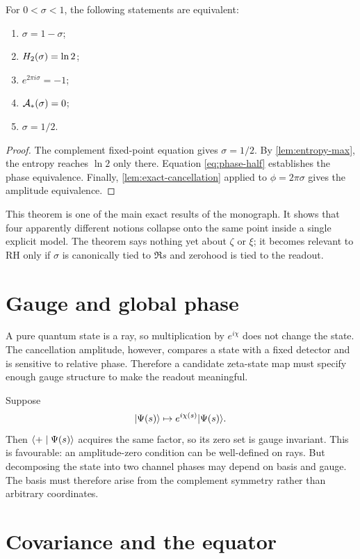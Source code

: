 \begin{theorem}
\label{thm:triple-coincidence}
For $0<\sigma<1$, the following statements are equivalent:
\begin{enumerate}
  \item $\sigma=1-\sigma$;
  \item $H_2(\sigma)=\ln2$;
  \item $e^{2\pi i\sigma}=-1$;
  \item $\mathcal{A}_*(\sigma)=0$;
  \item $\sigma=1/2$.
\end{enumerate}
\end{theorem}
\begin{proof}
The complement fixed-point equation gives $\sigma=1/2$. By \cref{lem:entropy-max}, the entropy reaches $\ln2$ only there. Equation \cref{eq:phase-half} establishes the phase equivalence. Finally, \cref{lem:exact-cancellation} applied to $\phi=2\pi\sigma$ gives the amplitude equivalence.
\end{proof}

This theorem is one of the main exact results of the monograph. It shows that four apparently different notions collapse onto the same point inside a single explicit model. The theorem says nothing yet about $\zeta$ or $\xi$; it becomes relevant to RH only if $\sigma$ is canonically tied to $\Re s$ and zerohood is tied to the readout.

\section{Gauge and global phase}

A pure quantum state is a ray, so multiplication by $e^{i\chi}$ does not change the state. The cancellation amplitude, however, compares a state with a fixed detector and is sensitive to relative phase. Therefore a candidate zeta-state map must specify enough gauge structure to make the readout meaningful.

Suppose
\[
 \lvert \Psi(s)\rangle\mapsto e^{i\chi(s)}\lvert \Psi(s)\rangle.
\]
Then $\langle +\mid \Psi(s)\rangle$ acquires the same factor, so its zero set is gauge invariant. This is favourable: an amplitude-zero condition can be well-defined on rays. But decomposing the state into two channel phases may depend on basis and gauge. The basis must therefore arise from the complement symmetry rather than arbitrary coordinates.

\section{Covariance and the equator}

